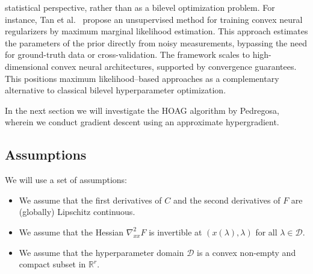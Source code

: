 \documentclass[11pt, twoside]{report}
\begin{document}
statistical perspective, rather than as a bilevel optimization problem. For instance, Tan et al.~\cite{tan2024unsupervised} propose an unsupervised method for training convex neural regularizers by maximum marginal likelihood estimation. This approach estimates the parameters of the prior directly from noisy measurements, bypassing the need for ground-truth data or cross-validation. The framework scales to high-dimensional convex neural architectures, supported by convergence guarantees. This positions maximum likelihood--based approaches as a complementary alternative to classical bilevel hyperparameter optimization.

In the next section we will investigate the HOAG algorithm by Pedregosa, wherein we conduct gradient descent using an approximate hypergradient.

\subsection{Assumptions}
We will use a set of assumptions:
\begin{itemize}
    \item We assume that the first derivatives of $C$ and the second derivatives of $F$ are (globally) Lipschitz continuous.
    \item We assume that the Hessian $\nabla_{xx}^2 F$ is invertible at $(x(\lambda),\lambda)$ for all $\lambda \in \mathcal{D}$.
    \item We assume that the hyperparameter domain $\mathcal{D}$ is a convex non-empty and compact subset in $\mathbb{R}^r$.
\end{itemize}

\end{document}
